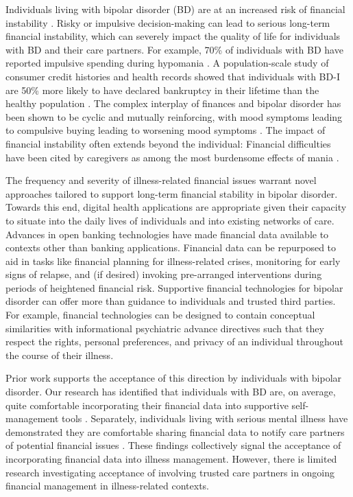 \documentclass[10pt]{article}
\begin{document}
Individuals living with bipolar disorder (BD) are at an increased risk of financial instability \cite{richardsonfinancial2018}. Risky or impulsive decision-making can lead to serious long-term financial instability, which can severely impact the quality of life for individuals with BD and their care partners. For example, 70\% of individuals with BD have reported impulsive spending during hypomania \cite{fletcherhighrisk2013}. A population-scale study of consumer credit histories and health records showed that individuals with BD-I are 50\% more likely to have declared bankruptcy in their lifetime than the healthy population \cite{nauassessment2023}. The complex interplay of finances and bipolar disorder has been shown to be cyclic and mutually reinforcing, with mood symptoms leading to compulsive buying leading to worsening mood symptoms \cite{richardsonfinancial2018}. The impact of financial instability often extends beyond the individual: Financial difficulties have been cited by caregivers as among the most burdensome effects of mania \cite{beentjescaregiver2012}.

The frequency and severity of illness-related financial issues warrant novel approaches tailored to support long-term financial stability in bipolar disorder. Towards this end, digital health applications are appropriate given their capacity to situate into the daily lives of individuals and into existing networks of care. Advances in open banking technologies have made financial data available to contexts other than banking applications. Financial data can be repurposed to aid in tasks like financial planning for illness-related crises, monitoring for early signs of relapse, and (if desired) invoking pre-arranged interventions during periods of heightened financial risk. Supportive financial technologies for bipolar disorder can offer more than guidance to individuals and trusted third parties. For example, financial technologies can be designed to contain conceptual similarities with informational psychiatric advance directives such that they respect the rights, personal preferences, and privacy of an individual throughout the course of their illness.

Prior work supports the acceptance of this direction by individuals with bipolar disorder. Our research has identified that individuals with BD are, on average, quite comfortable incorporating their financial data into supportive self-management tools \cite{brozenasupportive2024}. Separately, individuals living with serious mental illness have demonstrated they are comfortable sharing financial data to notify care partners of potential financial issues \cite{barrospenafinancial2021}. These findings collectively signal the acceptance of incorporating financial data into illness management. However, there is limited research investigating acceptance of involving trusted care partners in ongoing financial management in illness-related contexts.
\end{document}
